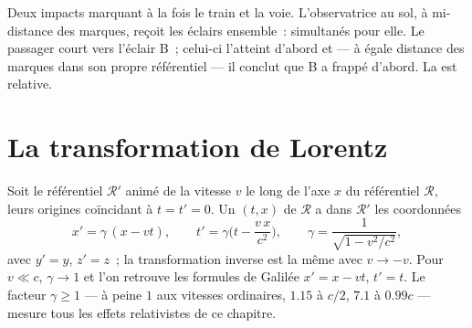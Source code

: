 \begin{omfigure}

{\small Deux impacts marquant à la fois le train et la voie.
L'observatrice au sol, à mi-distance des marques, reçoit les éclairs
ensemble~: simultanés pour elle. Le passager court vers l'éclair B~;
celui-ci l'atteint d'abord et --- à égale distance des marques dans son
propre référentiel --- il conclut que B a frappé d'abord. La
 est relative.}
\end{omfigure}

\section{La transformation de Lorentz}

\begin{theorem}\label{thm:b3:relativistic-kinematics:lorentz}
Soit le référentiel $\mathcal R'$ animé de la vitesse $v$ le long de
l'axe $x$ du référentiel $\mathcal R$, leurs origines coïncidant à
$t = t' = 0$. Un  $(t, x)$ de $\mathcal R$ a dans
$\mathcal R'$ les coordonnées
\[
x' = \gamma\,(x - vt) , \qquad
t' = \gamma\Big(t - \frac{v\,x}{c^2}\Big) , \qquad
\gamma = \frac{1}{\sqrt{1 - v^2/c^2}} ,
\]
avec $y' = y$, $z' = z$~; la transformation inverse est la même avec
$v \to -v$. Pour $v \ll c$, $\gamma \to 1$ et l'on retrouve les
formules de Galilée $x' = x - vt$, $t' = t$. Le facteur $\gamma \ge 1$
--- à peine $1$ aux vitesses ordinaires, $1.15$ à $c/2$, $7.1$ à
$0.99c$ --- mesure tous les effets relativistes de ce chapitre.
\end{theorem}


